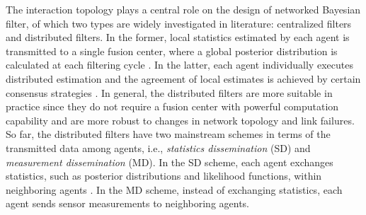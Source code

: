 	The interaction topology plays a central role on the design of networked Bayesian filter, of which two types are widely investigated in literature: centralized filters and distributed filters.
	In the former, local statistics estimated by each agent is transmitted to a single fusion center, where a global posterior distribution is calculated at each filtering cycle \cite{zuo2006bandwidth,vemula2006target}. 
	In the latter, each agent individually executes distributed estimation and the agreement of local estimates is achieved by certain consensus strategies \cite{jadbabaie2003coordination,ren2005consensus,olfati2007consensus}.
	In general, the distributed filters are more suitable in practice since they do not require a fusion center with powerful computation capability and are more robust to changes in network topology and link failures. 
	So far, the distributed filters have two mainstream schemes in terms of the transmitted data among agents, i.e., \textit{statistics dissemination} (SD) and \textit{measurement dissemination} (MD). 
	In the SD scheme, each agent exchanges statistics, such as posterior distributions and likelihood functions, within neighboring agents \cite{hlinka2013distributed}. 
	In the MD scheme, instead of exchanging statistics, each agent sends sensor measurements to neighboring agents. 
	
